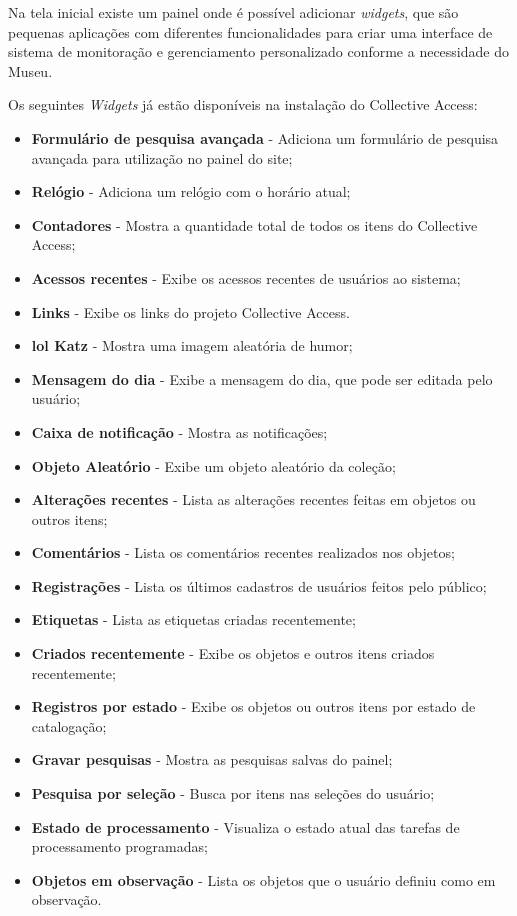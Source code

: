 \documentclass[a4paper,12pt,oneside,onecolumn,final,fleqn]{repUERJ}
\begin{document}
Na tela inicial existe um painel onde é possível adicionar \textit{widgets}, que são pequenas aplicações com diferentes funcionalidades para criar uma interface de sistema de monitoração e gerenciamento personalizado conforme a necessidade do Museu.

Os seguintes \textit{Widgets} já estão disponíveis na instalação do Collective Access:

\begin{itemize}
	\item \textbf{Formulário de pesquisa avançada} - Adiciona um formulário de pesquisa avançada para utilização no painel do site;
	\item \textbf{Relógio} - Adiciona um relógio com o horário atual;
	\item \textbf{Contadores} - Mostra a quantidade total de todos os itens do Collective Access;
	\item \textbf{Acessos recentes} - Exibe os acessos recentes de usuários ao sistema;
	\item \textbf{Links} - Exibe os links do projeto Collective Access.
	\item \textbf{lol Katz} - Mostra uma imagem aleatória de humor;
	\item \textbf{Mensagem do dia} - Exibe a mensagem do dia, que pode ser editada pelo usuário;
	\item \textbf{Caixa de notificação} - Mostra as notificações;
	\item \textbf{Objeto Aleatório} - Exibe um objeto aleatório da coleção;
	\item \textbf{Alterações recentes} - Lista as alterações recentes feitas em objetos ou outros itens;
	\item \textbf{Comentários} - Lista os comentários recentes realizados nos objetos;
	\item \textbf{Registrações} - Lista os últimos cadastros de usuários feitos pelo público;
	\item \textbf{Etiquetas} - Lista as etiquetas criadas recentemente;
	\item \textbf{Criados recentemente} - Exibe os objetos e outros itens criados recentemente;
	\item \textbf{Registros por estado} - Exibe os objetos ou outros itens por estado de catalogação;
	\item \textbf{Gravar pesquisas} - Mostra as pesquisas salvas do painel;
	\item \textbf{Pesquisa por seleção} - Busca por itens nas seleções do usuário;
	\item \textbf{Estado de processamento} - Visualiza o estado atual das tarefas de processamento programadas;
	\item \textbf{Objetos em observação} - Lista os objetos que o usuário definiu como em observação.
\end{itemize}
\end{document}
